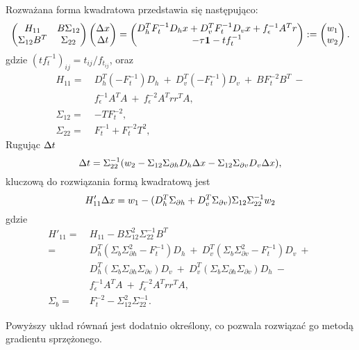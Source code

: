 Rozważana forma kwadratowa przedstawia się następująco:
\[ 
\left(\begin{matrix} H_{11} & B\Sigma_{12} \\
\Sigma_{12}B^T & \Sigma_{22} \end{matrix}\right)
\left(\begin{matrix} \Delta x \\ \Delta t \end{matrix}\right) =
\left(\begin{matrix} D_h^T F_t^{-1}D_h x + D_v^TF_t^{-1}D_v x + f_\epsilon^{-1}A^Tr \\
-\tau\mathbf{1} - tf^{-1}_t \end{matrix}\right) :=
\left(\begin{matrix} w_1 \\ w_2 \end{matrix}\right).
\]
gdzie $(tf^{-1}_t)_{ij} = t_{ij}/f_{t_{ij}}$, oraz 
\begin{align*}
H_{11} = ~& D_h^T(-F_t^{-1})D_h ~+~ D_v^T(-F_t^{-1})D_v ~+~ B F_t^{-2}B^T ~- \\
 & f_\epsilon^{-1} A^TA ~+~ f_\epsilon^{-2} A^Trr^TA, \\
\Sigma_{12} = ~& -TF_t^{-2}, \\
\Sigma_{22} = ~& F_t^{-1} + F_t^{-2}T^2,
\end{align*}
Rugując $\Delta t$
\[
\Delta t = \Sigma_{22}^{-1}(w_2 - \Sigma_{12}\Sigma_{\partial h}D_h\Delta x - \Sigma_{12}\Sigma_{\partial v}D_v\Delta x),
\]
kluczową do rozwiązania formą kwadratową jest
\[
H'_{11}\Delta x  = 
w_1 - (D_h^T\Sigma_{\partial h} + D_v^T\Sigma_{\partial v} )\Sigma_{12}\Sigma_{22}^{-1}w_2
\]
gdzie
\begin{align*}
H'_{11} = ~& H_{11} - B\Sigma^2_{12}\Sigma_{22}^{-1}B^T \\
= ~& D_h^T(\Sigma_b\Sigma^2_{\partial h}-F_t^{-1})D_h ~+~
D_v^T(\Sigma_b\Sigma^2_{\partial v}-F_t^{-1})D_v ~+~\\
~& D_h^T(\Sigma_b\Sigma_{\partial h}\Sigma_{\partial v})D_v ~+~
D_v^T(\Sigma_b\Sigma_{\partial h}\Sigma_{\partial v})D_h ~-~ \\
~& f_\epsilon^{-1} A^TA ~+~ f_\epsilon^{-2} A^Trr^TA, \\
\Sigma_b = ~& F_t^{-2} - \Sigma_{12}^2\Sigma_{22}^{-1}.
\end{align*}

Powyższy układ równań jest dodatnio określony, co pozwala rozwiązać go metodą gradientu sprzężonego.

